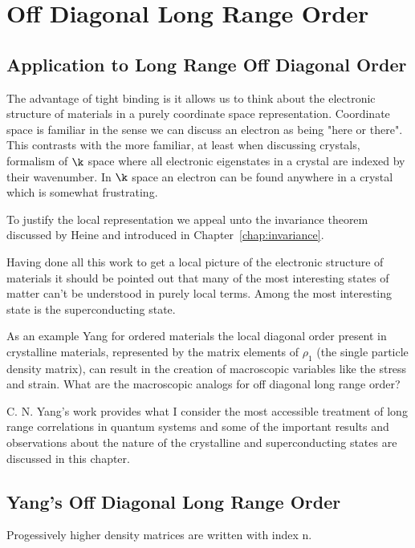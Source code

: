 \chapter{Off Diagonal Long Range Order}
\label{chap:odlro}
\section{Application to Long Range Off Diagonal Order}
The advantage of tight binding is it allows us to think about
the electronic structure of materials in a purely coordinate space representation.
Coordinate space is familiar in the sense we can discuss an electron as being
"here or there". This contrasts with the more familiar, at least when discussing crystals,
formalism of $\k$ space where all electronic eigenstates in a crystal are indexed by
their wavenumber. In $\k$ space an electron can be found anywhere in a crystal which
is somewhat frustrating. 

To justify the local representation we appeal unto the invariance theorem discussed 
by Heine and introduced in Chapter~\ref{chap:invariance}.

Having done all this work to get a local picture of the electronic structure of materials
it should be pointed out that many of the most interesting states of matter can't 
be understood in purely local terms. Among the most interesting state is the
superconducting state.

As an example Yang for ordered materials the local diagonal order present in crystalline materials,
represented by the matrix elements of $\rho_{1}$ (the single particle density matrix),
can result in the creation of macroscopic variables like the stress and strain.
What are the macroscopic analogs for off diagonal long range order?

C. N. Yang's work provides what I consider the most accessible treatment of long range
correlations in quantum systems and some of the important results and observations about
the nature of the crystalline and superconducting states are discussed in this chapter. 

\section{Yang's Off Diagonal Long Range Order}
Progessively higher density matrices are written with index n. 

